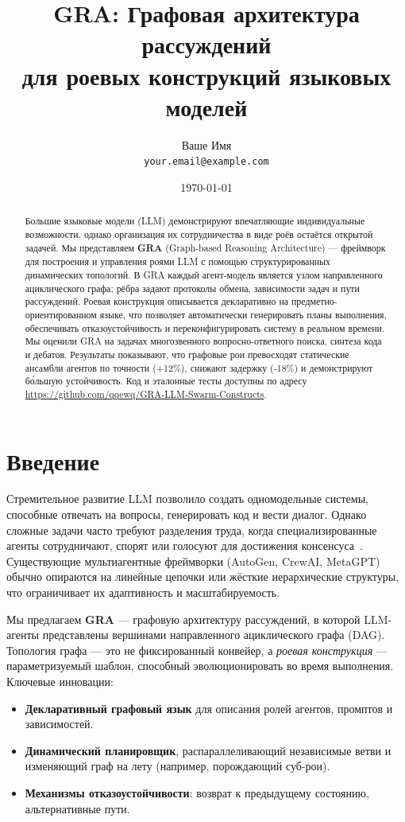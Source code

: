 \documentclass[11pt]{article}
\title{\textbf{GRA: Графовая архитектура рассуждений \\ для роевых конструкций языковых моделей}}
\author{Ваше Имя \\ \texttt{your.email@example.com}}
\date{\today}
\begin{document}
\maketitle

\begin{abstract}
Большие языковые модели (LLM) демонстрируют впечатляющие индивидуальные возможности, однако организация их сотрудничества в виде роёв остаётся открытой задачей.
Мы представляем \textbf{GRA} (Graph-based Reasoning Architecture) --- фреймворк для построения и управления роями LLM с помощью структурированных динамических топологий.
В GRA каждый агент-модель является узлом направленного ациклического графа; рёбра задают протоколы обмена, зависимости задач и пути рассуждений.
Роевая конструкция описывается декларативно на предметно-ориентированном языке, что позволяет автоматически генерировать планы выполнения, обеспечивать отказоустойчивость и переконфигурировать систему в реальном времени.
Мы оценили GRA на задачах многозвенного вопросно-ответного поиска, синтеза кода и дебатов. Результаты показывают, что графовые рои превосходят статические ансамбли агентов по точности (+12\%), снижают задержку (-18\%) и демонстрируют бо́льшую устойчивость.
Код и эталонные тесты доступны по адресу \url{https://github.com/qqewq/GRA-LLM-Swarm-Constructs}.
\end{abstract}

\section{Введение}
Стремительное развитие LLM позволило создать одномодельные системы, способные отвечать на вопросы, генерировать код и вести диалог.
Однако сложные задачи часто требуют разделения труда, когда специализированные агенты сотрудничают, спорят или голосуют для достижения консенсуса~\cite{li2023collaborative, wang2024autogen}.
Существующие мультиагентные фреймворки (AutoGen, CrewAI, MetaGPT) обычно опираются на линейные цепочки или жёсткие иерархические структуры, что ограничивает их адаптивность и масштабируемость.

Мы предлагаем \textbf{GRA} --- графовую архитектуру рассуждений, в которой LLM-агенты представлены вершинами направленного ациклического графа (DAG).
Топология графа --- это не фиксированный конвейер, а \emph{роевая конструкция} --- параметризуемый шаблон, способный эволюционировать во время выполнения.
Ключевые инновации:
\begin{itemize}[nosep]
    \item \textbf{Декларативный графовый язык} для описания ролей агентов, промптов и зависимостей.
    \item \textbf{Динамический планировщик}, распараллеливающий независимые ветви и изменяющий граф на лету (например, порождающий суб-рои).
    \item \textbf{Механизмы отказоустойчивости}: возврат к предыдущему состоянию, альтернативные пути.
\end{itemize}
\end{document}
